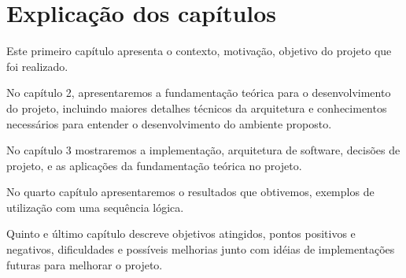 	\section{Explicação dos capítulos}

		Este primeiro capítulo apresenta o contexto, motivação, objetivo do projeto que foi realizado. 

		No capítulo 2, apresentaremos a fundamentação teórica para o desenvolvimento do projeto, incluindo maiores detalhes técnicos da arquitetura e conhecimentos necessários para entender o desenvolvimento do ambiente proposto. 

		No capítulo 3 mostraremos a implementação, arquitetura de software, decisões de projeto, e as aplicações da fundamentação teórica no projeto. 

		No quarto capítulo apresentaremos o resultados que obtivemos, exemplos de utilização com uma sequência lógica. 

		Quinto e último capítulo descreve objetivos atingidos, pontos positivos e negativos, dificuldades e possíveis melhorias junto com idéias de implementações futuras para melhorar o projeto. 




